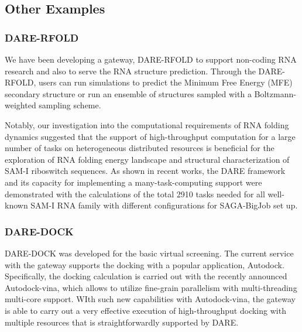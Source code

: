 \documentclass[]{svjour3}
\begin{document}
\subsection{Other Examples}
\subsubsection{DARE-RFOLD}
We have been developing a gateway, DARE-RFOLD to support non-coding RNA research
and also to serve the RNA structure prediction. Through the DARE-RFOLD,
users can run simulations to predict the Minimum Free Energy (MFE) secondary
structure or run an ensemble of structures sampled with a Boltzmann-weighted
sampling scheme.


Notably, our investigation into the computational requirements of RNA
folding dynamics suggested that the support of high-throughput
computation for a large number of tasks on heterogeneous distributed
resources is beneficial for the exploration of RNA folding energy
landscape and structural characterization of SAM-I riboswitch
sequences. As shown in recent works\cite{ecmls10,ccpe11}, the DARE
framework and its capacity for implementing a many-task-computing
support were demonstrated with the calculations of the total 2910
tasks needed for all well-known SAM-I RNA family with different
configurations for SAGA-BigJob set up\cite{ecmls10}.


\subsubsection{DARE-DOCK}
DARE-DOCK was developed for the basic virtual screening.  The current service with the gateway supports the docking with a popular application, Autodock\cite{autodock}.   Specifically, the docking calculation is carried out with the recently announced Autodock-vina, which allows to utilize fine-grain parallelism with multi-threading multi-core
support.  WIth such new capabilities with Autodock-vina, the gateway is able to carry out a very effective execution of high-throughput docking with multiple resources that is straightforwardly supported by DARE.  
\end{document}
